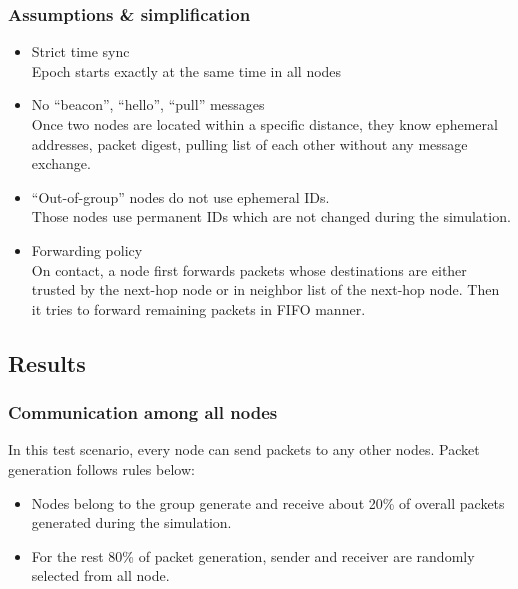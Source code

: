 \documentclass[11pt]{article}
\begin{document}
\subsubsection{Assumptions \& simplification}
\begin{itemize}

 \item Strict time sync\\
Epoch starts exactly at the same time in all nodes

 \item No ``beacon'', ``hello'', ``pull'' messages\\
 Once two nodes are located within a specific distance, they know ephemeral addresses, packet digest, pulling list of each other without any message exchange. 

 \item ``Out-of-group'' nodes do not use ephemeral IDs.\\
 Those nodes use permanent IDs which are not changed during the simulation.

 \item Forwarding policy\\
On contact, a node first forwards packets whose destinations are either trusted by the next-hop node or in neighbor list of the next-hop node.  Then it tries to forward remaining packets in FIFO manner. 
\end{itemize}







\clearpage
\subsection{Results}


\subsubsection{Communication among all nodes}
In this test scenario, every node can send packets to any other nodes.
Packet generation follows rules below:
\begin{itemize}
\item Nodes belong to the group generate and receive about 20\% of overall packets generated during the simulation. 
\item For the rest 80\% of packet generation, sender and receiver are randomly selected from all node. 
\end{itemize}
\end{document}
